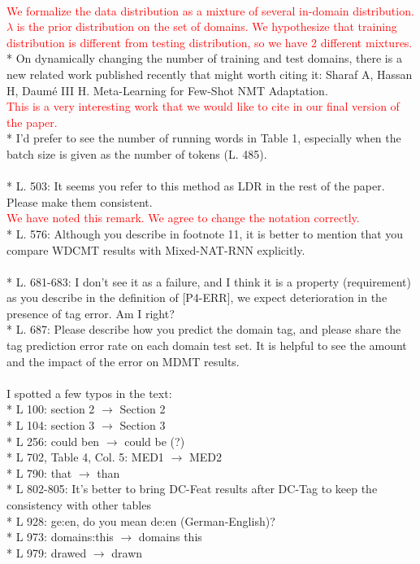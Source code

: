 \documentclass[12pt,times,a4paper,twoside]{article}
\newcommand{\fyTodo}[1]{\Todo[FY:]{\textcolor{orange}{#1}}}
\theoremstyle{definition}
\begin{document}
\\
\textcolor{red}{We formalize the data distribution as a mixture of several in-domain distribution. $\lambda$ is the prior distribution on the set of domains. We hypothesize that training distribution is different from testing distribution, so we have 2 different mixtures.}
\\
* On dynamically changing the number of training and test domains, there is a new related work published recently that might worth citing it: Sharaf A, Hassan H, Daumé III H. Meta-Learning for Few-Shot NMT Adaptation.
\\
\textcolor{red}{This is a very interesting work that we would like to cite in our final version of the paper.}
\\
* I’d prefer to see the number of running words in Table 1, especially when the batch size is given as the number of tokens (L. 485).
\\
\fyTodo{to report number of tokens of the datasets}
\\
* L. 503: It seems you refer to this method as LDR in the rest of the paper. Please make them consistent.
\\
\textcolor{red}{We have noted this remark. We agree to change the notation correctly.}
\\
* L. 576: Although you describe in footnote 11, it is better to mention that you compare WDCMT results with Mixed-NAT-RNN explicitly.
\\
\fyTodo{to explicitly compare WDCNMT with Mixed-NAT-RNN}
\\
* L. 681-683: I don’t see it as a failure, and I think it is a property (requirement) as you describe in the definition of [P4-ERR], we expect deterioration in the presence of tag error. Am I right?
\\
* L. 687: Please describe how you predict the domain tag, and please share the tag prediction error rate on each domain test set. It is helpful to see the amount and the impact of the error on MDMT results.
\\
\fyTodo{to report in details the tag prediction.}
\\
I spotted a few typos in the text:
\\
* L 100: section 2 $\rightarrow$ Section 2
\\
* L 104: section 3 $\rightarrow$ Section 3
\\
* L 256: could ben $\rightarrow$ could be (?)
\\
* L 702, Table 4, Col. 5: MED1 $\rightarrow$ MED2
\\
* L 790: that $\rightarrow$ than
\\
* L 802-805: It’s better to bring DC-Feat results after DC-Tag to keep the consistency with other tables 
\\
* L 928: ge:en, do you mean de:en (German-English)? 
\\
* L 973: domains:this $\rightarrow$ domains this
\\
* L 979: drawed $\rightarrow$ drawn 
\end{document}
